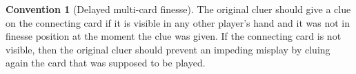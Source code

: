 \documentclass[a4paper]{article}
\theoremstyle{plain}
\theoremstyle{definition}
\newtheorem{convention}[theorem]{Convention}
\begin{document}
\begin{convention}[Delayed multi-card finesse]

	The original cluer should give a clue on the connecting card if it is visible in any other player's hand and it was not in finesse position at the moment the clue was given. If the connecting card is not visible, then the original cluer should prevent an impeding misplay by cluing again the card that was supposed to be played.
	

\end{convention}
\end{document}
